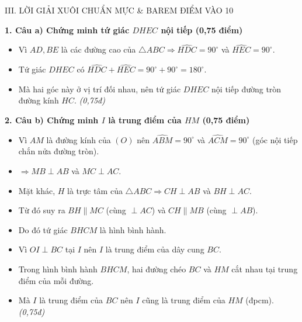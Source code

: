 \documentclass[11pt,a4paper]{article}
\begin{document}
\begin{solutionbox}{III. LỜI GIẢI XUÔI CHUẨN MỰC \& BAREM ĐIỂM VÀO 10}

\textbf{1. Câu a) Chứng minh tứ giác $DHEC$ nội tiếp (0,75 điểm)}
\begin{itemize}[leftmargin=5mm]
    \item Vì $AD, BE$ là các đường cao của $\triangle ABC \Rightarrow \widehat{HDC} = 90^\circ$ và $\widehat{HEC} = 90^\circ$.
    \item Tứ giác $DHEC$ có $\widehat{HDC} + \widehat{HEC} = 90^\circ + 90^\circ = 180^\circ$.
    \item Mà hai góc này ở vị trí đối nhau, nên tứ giác $DHEC$ nội tiếp đường tròn đường kính $HC$. \hfill \textit{(0,75đ)}
\end{itemize}

\vspace{0.8mm}
\textbf{2. Câu b) Chứng minh $I$ là trung điểm của $HM$ (0,75 điểm)}
\begin{itemize}[leftmargin=5mm]
    \item Vì $AM$ là đường kính của $(O)$ nên $\widehat{ABM} = 90^\circ$ và $\widehat{ACM} = 90^\circ$ (góc nội tiếp chắn nửa đường tròn).
    \item $\Rightarrow MB \perp AB$ và $MC \perp AC$.
    \item Mặt khác, $H$ là trực tâm của $\triangle ABC \Rightarrow CH \perp AB$ và $BH \perp AC$.
    \item Từ đó suy ra $BH \parallel MC$ (cùng $\perp AC$) và $CH \parallel MB$ (cùng $\perp AB$).
    \item Do đó tứ giác $BHCM$ là hình bình hành.
    \item Vì $OI \perp BC$ tại $I$ nên $I$ là trung điểm của dây cung $BC$.
    \item Trong hình bình hành $BHCM$, hai đường chéo $BC$ và $HM$ cắt nhau tại trung điểm của mỗi đường.
    \item Mà $I$ là trung điểm của $BC$ nên $I$ cũng là trung điểm của $HM$ (đpcm). \hfill \textit{(0,75đ)}
\end{itemize}


\end{solutionbox}
\end{document}

